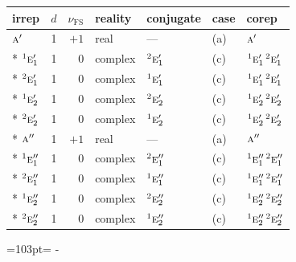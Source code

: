 \documentclass[10pt,a4paper]{article}
\newcommand{\needspace}[1]{\par\penalty-100\begingroup\dimen0=#1\relax\dimen2=\pagegoal
  \advance\dimen2-\pagetotal\ifdim\dimen0>\dimen2\relax\ifdim\dimen2>0pt\vfil\break\fi\fi
  \endgroup}
\numberwithin{equation}{section}
\newcommand{\irr}[1]{\text{\normalfont\scshape #1}}
\newcommand{\conjpair}[1]{{}^{#1}}
\newcommand{\fsind}{\nu_{\mathrm{FS}}}
\begin{document}
{\small\renewcommand{\arraystretch}{1.25}\setlength{\tabcolsep}{4pt}\begin{longtable}{@{}lrrllll@{}}\toprule
irrep & $d$ & $\fsind$ & reality & conjugate & case & corep\\\midrule\endhead
\bottomrule\endfoot\endlastfoot
$\irr{a}'$ & 1 & $+1$ & real & --- & (a) & $\irr{a}'$\\*
$\conjpair{1}\irr{e}_{1}'$ & 1 & $0$ & complex & $\conjpair{2}\irr{e}_{1}'$ & (c) & $\conjpair{1}\irr{e}_{1}'\,\conjpair{2}\irr{e}_{1}'$\\*
$\conjpair{2}\irr{e}_{1}'$ & 1 & $0$ & complex & $\conjpair{1}\irr{e}_{1}'$ & (c) & $\conjpair{1}\irr{e}_{1}'\,\conjpair{2}\irr{e}_{1}'$\\*
$\conjpair{1}\irr{e}_{2}'$ & 1 & $0$ & complex & $\conjpair{2}\irr{e}_{2}'$ & (c) & $\conjpair{1}\irr{e}_{2}'\,\conjpair{2}\irr{e}_{2}'$\\*
$\conjpair{2}\irr{e}_{2}'$ & 1 & $0$ & complex & $\conjpair{1}\irr{e}_{2}'$ & (c) & $\conjpair{1}\irr{e}_{2}'\,\conjpair{2}\irr{e}_{2}'$\\*
$\irr{a}''$ & 1 & $+1$ & real & --- & (a) & $\irr{a}''$\\*
$\conjpair{1}\irr{e}_{1}''$ & 1 & $0$ & complex & $\conjpair{2}\irr{e}_{1}''$ & (c) & $\conjpair{1}\irr{e}_{1}''\,\conjpair{2}\irr{e}_{1}''$\\*
$\conjpair{2}\irr{e}_{1}''$ & 1 & $0$ & complex & $\conjpair{1}\irr{e}_{1}''$ & (c) & $\conjpair{1}\irr{e}_{1}''\,\conjpair{2}\irr{e}_{1}''$\\*
$\conjpair{1}\irr{e}_{2}''$ & 1 & $0$ & complex & $\conjpair{2}\irr{e}_{2}''$ & (c) & $\conjpair{1}\irr{e}_{2}''\,\conjpair{2}\irr{e}_{2}''$\\*
$\conjpair{2}\irr{e}_{2}''$ & 1 & $0$ & complex & $\conjpair{1}\irr{e}_{2}''$ & (c) & $\conjpair{1}\irr{e}_{2}''\,\conjpair{2}\irr{e}_{2}''$\\
\bottomrule\end{longtable}}
\needspace{103pt}
\end{document}
